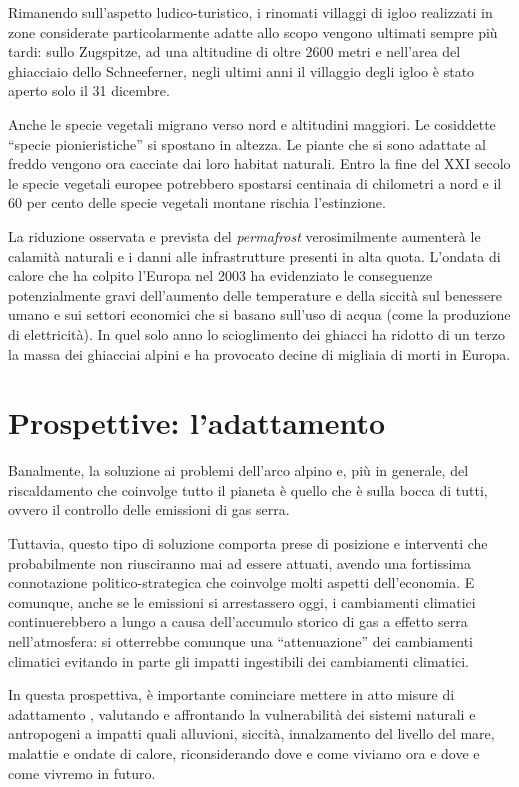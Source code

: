 \documentclass[14pt,a4paper]{article}
\begin{document}
		Rimanendo sull'aspetto ludico-turistico, i rinomati villaggi di igloo realizzati in zone considerate particolarmente adatte allo scopo vengono ultimati sempre più tardi: sullo Zugspitze, ad una altitudine di oltre 2600 metri e nell'area del ghiacciaio dello Schneeferner, negli ultimi anni il villaggio degli igloo è stato aperto solo il 31 dicembre.
		
		Anche le specie vegetali migrano verso nord e altitudini maggiori. Le cosiddette ``specie pionieristiche'' si spostano in altezza. Le piante che si sono adattate al freddo vengono ora cacciate dai loro habitat naturali. Entro la fine del XXI secolo le specie vegetali europee potrebbero spostarsi centinaia di chilometri a nord e il 60 per cento delle specie vegetali montane rischia l'estinzione.
		
		La riduzione osservata e prevista del \textit{permafrost} verosimilmente aumenterà le calamità naturali e i danni alle infrastrutture presenti in alta quota. L'ondata di calore che ha colpito l'Europa nel 2003 ha evidenziato le conseguenze potenzialmente gravi dell'aumento delle temperature e della siccità sul benessere umano e sui settori economici che si basano sull'uso di acqua (come la produzione di elettricità). In quel solo anno lo scioglimento dei ghiacci ha ridotto di un terzo la massa dei ghiacciai alpini e ha provocato decine di migliaia di morti in Europa.
	
	\section{Prospettive: l'adattamento}
		Banalmente, la soluzione ai problemi dell'arco alpino e, più in generale, del riscaldamento che coinvolge tutto il pianeta è quello che è sulla bocca di tutti, ovvero il controllo delle emissioni di gas serra.
		
		Tuttavia, questo tipo di soluzione comporta prese di posizione e interventi che probabilmente non riusciranno mai ad essere attuati, avendo una fortissima connotazione politico-strategica che coinvolge molti aspetti dell'economia. E comunque, anche se le emissioni si arrestassero oggi, i cambiamenti climatici continuerebbero a
		lungo a causa dell'accumulo storico di gas a effetto serra nell'atmosfera: si otterrebbe comunque una ``attenuazione'' dei cambiamenti climatici evitando in parte gli impatti ingestibili	dei cambiamenti climatici.
		
		In questa prospettiva, è importante cominciare mettere in atto misure di adattamento \cite{Relazione_AEA}, valutando e affrontando la
		vulnerabilità dei sistemi naturali e antropogeni a impatti quali alluvioni, siccità, innalzamento del livello del mare, malattie e
		ondate di calore, riconsiderando dove e come viviamo ora e dove e come vivremo in
		futuro.	
		
\end{document}
